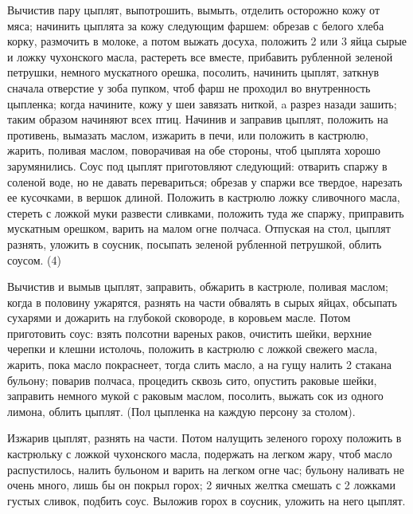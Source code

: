 Вычистив пару цыплят, выпотрошить, вымыть, отделить осторожно кожу от мяса; начинить цыплята за кожу следующим фаршем: обрезав с белого хлеба корку, размочить в молоке, а потом выжать досуха, положить 2 или 3 яйца сырые и ложку чухонского масла, растереть все вместе, прибавить рубленной зеленой петрушки, немного мускатного орешка, посолить, начинить цыплят, заткнув сначала отверстие у зоба пупком, чтоб фарш не проходил во внутренность цыпленка; когда начините, кожу у шеи завязать ниткой, a разрез назади зашить; таким образом начиняют всех птиц. Начинив и заправив цыплят, положить на противень, вымазать маслом, изжарить в печи, или положить в кастрюлю, жарить, поливая маслом, поворачивая на обе стороны, чтоб цыплята хорошо зарумянились. Соус под цыплят приготовляют следующий: отварить спаржу в соленой воде, но не давать перевариться; обрезав у спаржи все твердое, нарезать ее кусочками, в вершок длиной. Положить в кастрюлю ложку сливочного масла, стереть с ложкой муки развести сливками, положить туда же спаржу, приправить мускатным орешком, варить на малом огне полчаса. Отпуская на стол, цыплят разнять, уложить в соусник, посыпать зеленой рубленной петрушкой, облить соусом. (4) 


Вычистив и вымыв цыплят, заправить, обжарить в кастрюле, поливая маслом; когда в половину ужарятся, разнять на части обвалять в сырых яйцах, обсыпать сухарями и дожарить на глубокой сковороде, в коровьем масле. Потом приготовить соус: взять полсотни вареных раков, очистить шейки, верхние черепки и клешни истолочь, положить в кастрюлю с ложкой свежего масла, жарить, пока масло покраснеет, тогда слить масло, а на гущу налить 2 стакана бульону; поварив полчаса, процедить сквозь сито, опустить раковые шейки, заправить немного мукой с раковым маслом, посолить, выжать сок из одного лимона, облить цыплят. (Пол цыпленка на каждую персону за столом). 


Изжарив цыплят, разнять на части. Потом налущить зеленого гороху положить в кастрюльку с ложкой чухонского масла, подержать на легком жару, чтоб масло распустилось, налить бульоном и варить на легком огне час; бульону наливать не очень много, лишь бы он покрыл горох; 2 яичных желтка смешать с 2 ложками густых сливок, подбить соус. Выложив горох в соусник, уложить на него цыплят. 



